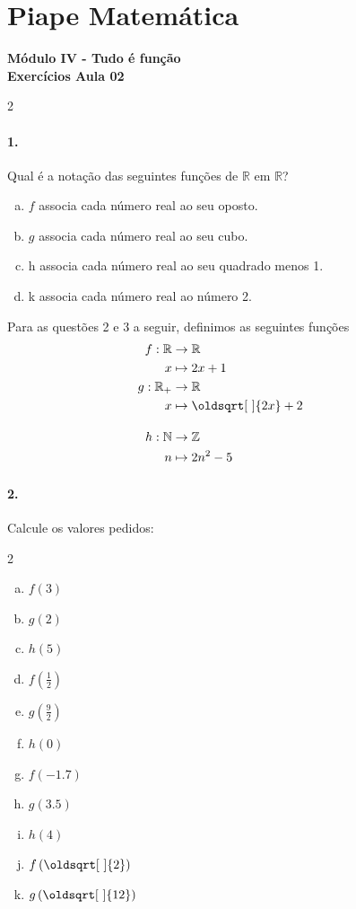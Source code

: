 \documentclass[a4paper,12pt]{article}
\renewcommand*{\sqrt}[2][\ ]{\oldsqrt[#1]{#2}}
\begin{document}
 
  
\section*{Piape Matemática} 
\textbf{Módulo IV - Tudo é função}\\
\textbf{Exercícios Aula 02}         
\begin{multicols}{2}
\paragraph*{1.}  
Qual é a notação das seguintes funções de $\mathbb{R}$ em $\mathbb{R}$?
\begin{enumerate}[a)] 
    \item $f$ associa cada número real ao seu oposto.
    \item $g$ associa cada número real ao seu cubo.
    \item h associa cada número real ao seu quadrado menos 1.
    \item k associa cada número real ao número 2.
\end{enumerate}

Para as questões 2 e 3 a seguir, definimos as seguintes funções
$$
\begin{aligned} 
f:\mathbb{R} &\to \mathbb{R} \\
x &\mapsto 2x + 1 \\
g:\mathbb{R}_{+} & \to \mathbb{R} \\
 x&\mapsto \sqrt{2x} + 2\\[1em]
h: \mathbb{N} &\to \mathbb{Z} &   &  \\
n &\mapsto 2n^2 - 5 &   &  \\
\end{aligned}
$$
\newcolumn
\paragraph*{2.} Calcule os valores pedidos:
\begin{multicols*}{2}
    \begin{enumerate}[a)]
        \item $f(3)$ %
        \item $g(2)$ %
        \item $h(5)$ %
        \item $f\left(\frac{1}{2}\right)$ %
        \item $g\left(\frac{9}{2}\right)$ %
        \item $h(0)$ %
        \item $f(-1.7)$ %
        \item $g(3.5)$ %
        \item $h(4)$ %
        \item $f\left(\sqrt{2}\right)$ %
        \item $g\left(\sqrt{12}\right)$ %
    \end{enumerate}
    

\end{multicols*}
\end{multicols}
\end{document}
